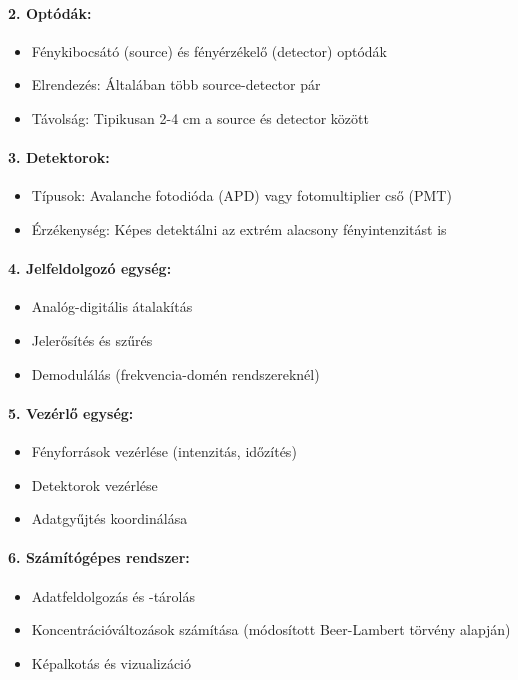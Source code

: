 \documentclass[a4paper,12pt]{article}
\begin{document}
\paragraph{2. Optódák:} \begin{itemize} \item Fénykibocsátó (source) és fényérzékelő (detector) optódák \item Elrendezés: Általában több source-detector pár \item Távolság: Tipikusan 2-4 cm a source és detector között \end{itemize}

\paragraph{3. Detektorok:} \begin{itemize} \item Típusok: Avalanche fotodióda (APD) vagy fotomultiplier cső (PMT) \item Érzékenység: Képes detektálni az extrém alacsony fényintenzitást is \end{itemize}

\paragraph{4. Jelfeldolgozó egység:} \begin{itemize} \item Analóg-digitális átalakítás \item Jelerősítés és szűrés \item Demodulálás (frekvencia-domén rendszereknél) \end{itemize}

\paragraph{5. Vezérlő egység:} \begin{itemize} \item Fényforrások vezérlése (intenzitás, időzítés) \item Detektorok vezérlése \item Adatgyűjtés koordinálása \end{itemize}

\paragraph{6. Számítógépes rendszer:} \begin{itemize} \item Adatfeldolgozás és -tárolás \item Koncentrációváltozások számítása (módosított Beer-Lambert törvény alapján) \item Képalkotás és vizualizáció \end{itemize}
\end{document}
